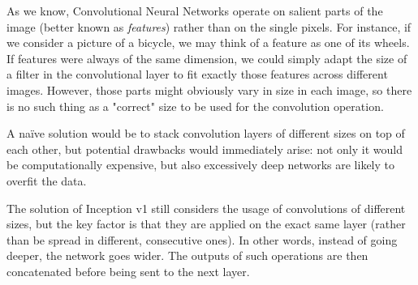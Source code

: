 \documentclass[12pt, twoside, a4paper]{report}
\begin{document}
As we know, Convolutional Neural Networks operate on salient parts of the image (better known as \textit{features}) rather than on the single pixels. For instance, if we consider a picture of a bicycle, we may think of a feature as one of its wheels. If features were always of the same dimension, we could simply adapt the size of a filter in the convolutional layer to fit exactly  those features across different images. However, those parts might obviously vary in size in each image, so there is no such thing as a "correct" size to be used for the convolution operation. 

A na\"ive solution would be to stack convolution layers of different sizes on top of each other, but potential drawbacks would immediately arise: not only it would be computationally expensive, but also excessively deep networks are likely to overfit the data. 

The solution of Inception v1 still considers the usage of convolutions of different sizes, but the key factor is that they are applied on the exact same layer (rather than be spread in different, consecutive ones). In other words, instead of going deeper, the network goes wider. The outputs of such operations are then concatenated before being sent to the next layer. 
\end{document}
